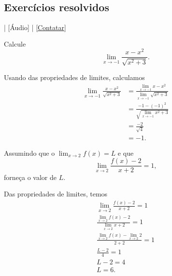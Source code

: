 \subsection*{Exercícios resolvidos}

\begin{flushright}
  [Vídeo] | [Áudio] | \href{https://phkonzen.github.io/notas/contato.html}{[Contatar]}
\end{flushright}

\begin{exeresol}
  Calcule
  \begin{equation}
    \lim_{x\to -1} \frac{x - x^2}{\sqrt{x^2+3}}.
  \end{equation}
\end{exeresol}
\begin{resol}
  Usando das propriedades de limites, calculamos
  \begin{align}
    \lim_{x\to -1} \frac{x-x^2}{\sqrt{x^2+3}} &= \frac{\displaystyle\lim_{x\to -1} x-x^2}{\displaystyle\lim_{x\to -1} \sqrt{x^2+3}} \\
                                              &= \frac{-1-(-1)^2}{\displaystyle\sqrt{\lim_{x\to -1} x^2+3}} \\
                                              &= \frac{-2}{\sqrt{4}} \\
                                              &= -1.
  \end{align}
\end{resol}

\begin{exeresol}
  Assumindo que o $\lim_{x\to 2} f(x) = L$ e que
  \begin{equation}
    \lim_{x\to 2} \frac{f(x)-2}{x+2} = 1,
  \end{equation}
  forneça o valor de $L$.
\end{exeresol}
\begin{resol}
  Das propriedades de limites, temos
  \begin{gather}
    \lim_{x\to 2} \frac{f(x)-2}{x+2} = 1\\
    \frac{\displaystyle\lim_{x\to 2} f(x)-2}{\displaystyle\lim_{x\to 2} x+2} = 1\\
    \frac{\lim_{x\to 2} f(x) - \lim_{x\to 2} 2}{2+2} = 1\\
    \frac{L-2}{4} = 1\\
    L-2 = 4\\
    L = 6.
  \end{gather}
\end{resol}


